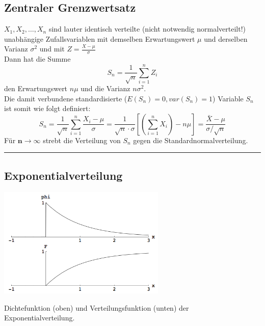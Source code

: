 	\subsection{Zentraler Grenzwertsatz }
    $X_1, X_2, \ldots , X_n$ sind lauter identisch verteilte (nicht notwendig normalverteilt!)
    unabhängige Zufallsvariablen mit demselben Erwartungswert $\mu$ und derselben Varianz $\sigma^2$
    und mit $Z = \frac{X-\mu}{\sigma}$\\
    Dann hat die Summe
    \begin{equation}
      S_n = \frac{1}{\sqrt{n}}\sum_{i=1}^n Z_i \nonumber
    \end{equation}
    den Erwartungswert $n \mu$ und die Varianz $n \sigma^2$. \\
    Die damit verbundene standardisierte ($E(S_n) = 0, var(S_n) = 1$) Variable $S_n$ ist somit wie
    folgt definiert: \\ 
    \begin{equation}
      S_n = \frac{1}{\sqrt{n}}\sum_{i=1}^n \frac{X_i - \mu}{\sigma}
      = \frac{1}{\sqrt{n}\cdot \sigma}\left[\left(\sum\limits_{i=1}^n X_i\right) -n \mu\right]
      =\dfrac{\bar{X} - \mu}{\sigma / \sqrt{n}} \nonumber
    \end{equation}
    Für $\boldsymbol{n \to \infty}$ strebt die Verteilung von $S_n$ gegen die
    Standardnormalverteilung. \\
        
\hrule

	\subsection{Exponentialverteilung }
		\begin{floatingfigure}[r]{8cm}
        \includegraphics[width=8cm]{./bilder/exponentialverteilung.png}
        \caption{Dichtefunktion (oben) und Verteilungsfunktion (unten) der
        Exponentialverteilung.} 		
		\end{floatingfigure}

